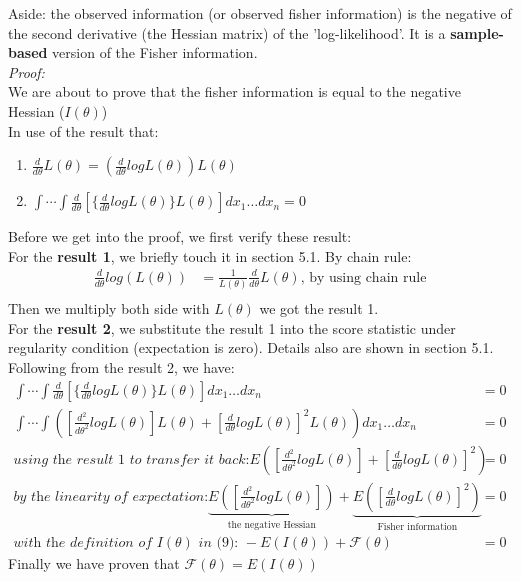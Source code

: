 \documentclass[12pt ]{article}
\begin{document}
\color{brown}
Aside: the observed information (or observed fisher information) is the negative of the second derivative (the Hessian matrix) of the 'log-likelihood'. It is a \textbf{sample-based} version of the Fisher information.
\color{black}\\

\textit{Proof:} \\
We are about to prove that the fisher information is equal to the negative Hessian ($I(\theta)$)\\
In use of the result that:
\begin{enumerate}
\item $\frac{d}{d\theta} L(\theta) =  (\frac{d}{d\theta} logL(\theta))L(\theta)$
\item $\int \cdots \int \frac{d}{d\theta} [ \{ \frac{d}{d\theta} logL(\theta)\} L(\theta)] dx_{1} \ldots dx_{n} = 0$
\end{enumerate}
\color{blue}
Before we get into the proof, we first verify these result: \\
For the \textbf{result 1}, we briefly touch it in section 5.1. By chain rule:
\begin{align*}
\frac{d}{d\theta} log(L(\theta)) &=  \frac{1}{L(\theta)} \frac{d}{d\theta}L(\theta) \text{,      by using chain rule} \\
\end{align*}
Then we multiply both side with $L(\theta)$ we got the result 1. \\
For the \textbf{result 2}, we substitute the result 1 into the score statistic under regularity condition (expectation is zero). Details also are shown in section 5.1.
\color{black}
Following from the result 2, we have:
\begin{align*}
\int \cdots \int \frac{d}{d\theta} [ \{ \frac{d}{d\theta} logL(\theta)\} L(\theta)] dx_{1} \ldots dx_{n} &= 0 \\
\int \cdots \int ([\frac{d^2}{d\theta^2}logL(\theta)] L(\theta) + [\frac{d}{d\theta}logL(\theta)]^2 L(\theta)) dx_{1} \ldots dx_{n}  &= 0 \\
\textit{using the result 1 to transfer it back:} E([\frac{d^2}{d\theta^2}logL(\theta)] + [\frac{d}{d\theta}logL(\theta)]^2) &= 0\\
\textit{by the linearity of expectation:}
\underbrace{E([\frac{d^2}{d\theta^2}logL(\theta)])}_{\text{the negative Hessian}}+ \underbrace{E([\frac{d}{d\theta}logL(\theta)]^2)}_{\text{Fisher information}} &=0 \\
\textit{with the definition of $I(\theta)$ in (9): }-E(I(\theta)) + \mathcal{F}(\theta) &= 0
\end{align*}
Finally we have proven that $\mathcal{F}(\theta) = E(I(\theta))$
\end{document}
